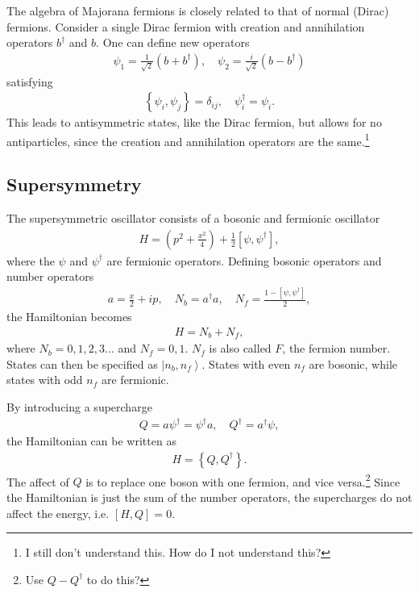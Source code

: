 \documentclass[12pt]{article} %
\renewcommand{\th}[1]{\frac{1}{#1}}
\newcommand{\ket}[1]{\left|#1\right\rangle}
\newcommand{\comm}[2]{\left[#1,#2\right]}
\newcommand{\acom}[2]{\left\{#1,#2\right\}}
\begin{document}
The algebra of Majorana fermions is closely related to that of normal (Dirac) fermions. Consider a single Dirac fermion with creation and annihilation operators $b^\dag$ and $b$. One can define new operators
\begin{align}
\psi_1 = \th{\sqrt{2}}(b+b^\dag ),\quad \psi_2 = \frac{i}{\sqrt{2}}(b-b^\dag)
\end{align}
satisfying
\begin{align}
\acom{\psi_i}{\psi_j} = \delta_{ij},\quad \psi_i^\dag=\psi_i.
\end{align}
This leads to antisymmetric states, like the Dirac fermion, but allows for no antiparticles, since the creation and annihilation operators are the same.\footnote{I still don't understand this. How do I not understand this?}

\subsection{Supersymmetry} \emph{} \label{sub:susy}

The supersymmetric oscillator consists of a bosonic and fermionic oscillator
\begin{align}
H = \left(p^2+\frac{x^2}{4}\right) + \th{2}\left[\psi, \psi^\dag\right],
\end{align}
where the $\psi$ and $\psi^\dag$ are fermionic operators. Defining bosonic operators and number operators
\begin{align}
a = \frac{x}{2}+ip,\quad N_b = a^\dag a,\quad N_f = \frac{1-\comm{\psi}{ \psi^\dag}}{2},
\end{align}
the Hamiltonian becomes
\begin{align}
H = N_b + N_f,
\end{align}
where $N_b = 0,1,2,3...$ and $N_f = 0,1$. $N_f$ is also called $F$, the fermion number. States can then be specified as $\ket{n_b,n_f}$. States with even $n_f$ are bosonic, while states with odd $n_f$ are fermionic.
 
By introducing a supercharge 
\begin{align}
Q = a\psi^\dag = \psi^\dag a,\quad Q^\dag = a^\dag\psi,
\end{align}
the Hamiltonian can be written as 
\begin{align}
H = \acom{Q}{Q^\dag}.
\end{align}
The affect of $Q$ is to replace one boson with one fermion, and vice versa.\footnote{Use $Q-Q^\dag$ to do this?} Since the Hamiltonian is just the sum of the number operators, the supercharges do not affect the energy, i.e. $\comm{H}{Q} = 0$.
\end{document}
